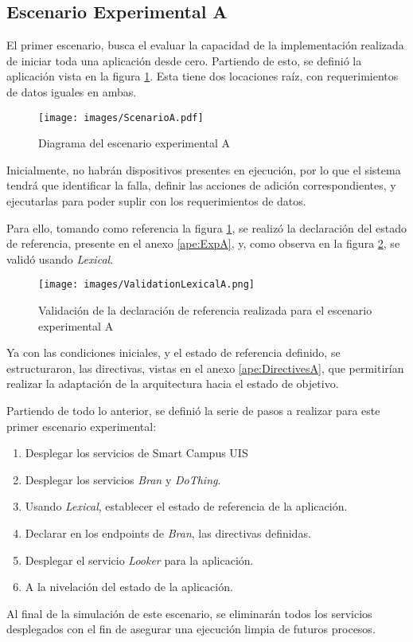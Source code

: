 \subsection{Escenario Experimental A} \label{sec:EscenarioExperimentalA}

El primer escenario, busca el evaluar la capacidad de la implementación realizada de iniciar toda una aplicación desde cero. Partiendo de esto, se definió la aplicación vista en la figura \ref{fig:ExpA}. Esta tiene dos locaciones raíz, con requerimientos de datos iguales en ambas.

\begin{figure}[H]
    \centering
    \caption{Diagrama del escenario experimental A}
    \label{fig:ExpA}
    \texttt{[image: images/ScenarioA.pdf]}
    \vspace{-4mm}
\end{figure}

Inicialmente, no habrán dispositivos presentes en ejecución, por lo que el sistema tendrá que identificar la falla, definir las acciones de adición correspondientes, y ejecutarlas para poder suplir con los requerimientos de datos.

Para ello, tomando como referencia la figura \ref{fig:ExpA}, se realizó la declaración del estado de referencia, presente en el anexo \ref{ape:ExpA}, y, como observa en la figura \ref{fig:ValidA}, se validó usando \textit{Lexical}.

\begin{figure}[H]
    \centering
    \caption{Validación de la declaración de referencia realizada para el escenario experimental A}
    \label{fig:ValidA}
    \texttt{[image: images/ValidationLexicalA.png]}
    \vspace{-4mm}
\end{figure}

Ya con las condiciones iniciales, y el estado de referencia definido, se estructuraron, las directivas, vistas en el anexo \ref{ape:DirectivesA}, que permitirían realizar la adaptación de la arquitectura hacia el estado de objetivo. 

Partiendo de todo lo anterior, se definió la serie de pasos a realizar para este primer escenario experimental:

\begin{enumerate}[itemsep=0mm]
    \item Desplegar los servicios de Smart Campus UIS
    \item Desplegar los servicios \textit{Bran} y \textit{DoThing}.
    \item Usando \textit{Lexical}, establecer el estado de referencia de la aplicación.
    \item Declarar en los endpoints de \textit{Bran}, las directivas definidas.
    \item Desplegar el servicio \textit{Looker} para la aplicación.
    \item A la nivelación del estado de la aplicación.
\end{enumerate}

Al final de la simulación de este escenario, se eliminarán todos los servicios desplegados con el fin de asegurar una ejecución limpia de futuros procesos.
